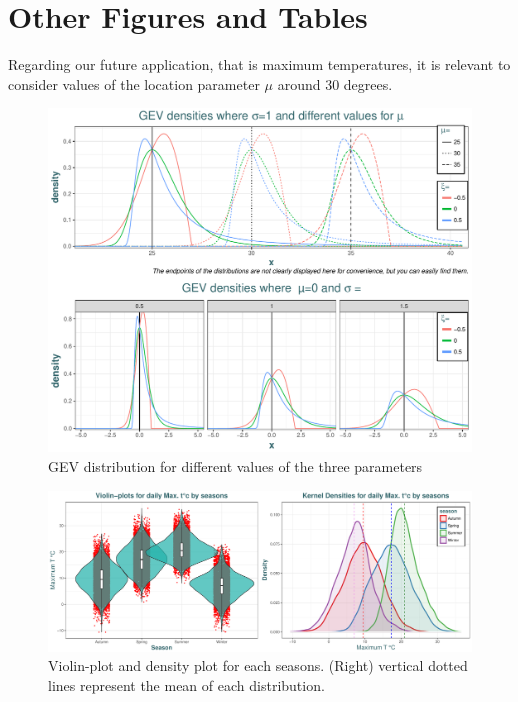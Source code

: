 \chapter{Other Figures and Tables}\label{app:fig}


Regarding our future application, that is maximum temperatures, it is relevant to consider values of the location parameter $\mu$ around 30 degrees. 


\begin{figure}[!htb]
	\includegraphics[width=\linewidth]{gevdif.pdf}\caption{GEV distribution for different values of the three parameters }\label{fig:gevdif}
\end{figure}




\begin{figure}[!htb]
	\includegraphics[width=1\linewidth]{violin_density.pdf}\caption{ Violin-plot and density plot for each seasons. (Right) vertical dotted lines represent the mean of each distribution.}\label{fig:violin_density}
\end{figure}

